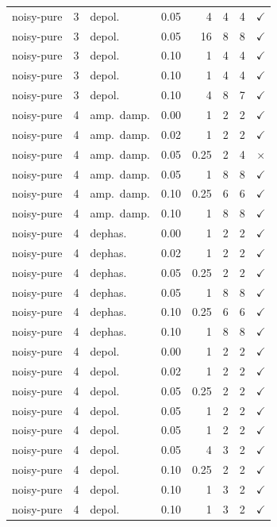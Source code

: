 \documentclass[a4paper,superscriptaddress,nofootinbib,onecolumn,nopdfoutputerror]{quantumarticle}
\begin{document}
\begin{center}
\begin{longtable}{@{}llllrrrc@{}}
noisy-pure & 3 & depol. & 0.05 & 4 & 4 & 4 & $\checkmark$ \\
noisy-pure & 3 & depol. & 0.05 & 16 & 8 & 8 & $\checkmark$ \\
noisy-pure & 3 & depol. & 0.10 & 1 & 4 & 4 & $\checkmark$ \\
noisy-pure & 3 & depol. & 0.10 & 1 & 4 & 4 & $\checkmark$ \\
noisy-pure & 3 & depol. & 0.10 & 4 & 8 & 7 & $\checkmark$ \\
noisy-pure & 4 & amp.\ damp. & 0.00 & 1 & 2 & 2 & $\checkmark$ \\
noisy-pure & 4 & amp.\ damp. & 0.02 & 1 & 2 & 2 & $\checkmark$ \\
noisy-pure & 4 & amp.\ damp. & 0.05 & 0.25 & 2 & 4 & $\times$ \\
noisy-pure & 4 & amp.\ damp. & 0.05 & 1 & 8 & 8 & $\checkmark$ \\
noisy-pure & 4 & amp.\ damp. & 0.10 & 0.25 & 6 & 6 & $\checkmark$ \\
noisy-pure & 4 & amp.\ damp. & 0.10 & 1 & 8 & 8 & $\checkmark$ \\
noisy-pure & 4 & dephas. & 0.00 & 1 & 2 & 2 & $\checkmark$ \\
noisy-pure & 4 & dephas. & 0.02 & 1 & 2 & 2 & $\checkmark$ \\
noisy-pure & 4 & dephas. & 0.05 & 0.25 & 2 & 2 & $\checkmark$ \\
noisy-pure & 4 & dephas. & 0.05 & 1 & 8 & 8 & $\checkmark$ \\
noisy-pure & 4 & dephas. & 0.10 & 0.25 & 6 & 6 & $\checkmark$ \\
noisy-pure & 4 & dephas. & 0.10 & 1 & 8 & 8 & $\checkmark$ \\
noisy-pure & 4 & depol. & 0.00 & 1 & 2 & 2 & $\checkmark$ \\
noisy-pure & 4 & depol. & 0.02 & 1 & 2 & 2 & $\checkmark$ \\
noisy-pure & 4 & depol. & 0.05 & 0.25 & 2 & 2 & $\checkmark$ \\
noisy-pure & 4 & depol. & 0.05 & 1 & 2 & 2 & $\checkmark$ \\
noisy-pure & 4 & depol. & 0.05 & 1 & 2 & 2 & $\checkmark$ \\
noisy-pure & 4 & depol. & 0.05 & 4 & 3 & 2 & $\checkmark$ \\
noisy-pure & 4 & depol. & 0.10 & 0.25 & 2 & 2 & $\checkmark$ \\
noisy-pure & 4 & depol. & 0.10 & 1 & 3 & 2 & $\checkmark$ \\
noisy-pure & 4 & depol. & 0.10 & 1 & 3 & 2 & $\checkmark$ \\

\end{longtable}
\end{center}
\end{document}
